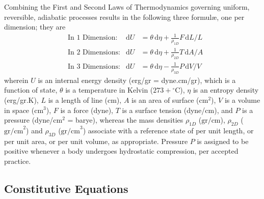 Combining the First and Second Laws of Thermo\-dynamics governing uniform, reversible, adiabatic processes results in the following three formul\ae, one per dimension; they are
\begin{subequations}
    \label{thermoelasticLaws}
    \begin{align}
    \mbox{} & \text{In 1 Dimension:} & 
    \mathrm{d}U & = \theta \, \mathrm{d} \eta +
    \tfrac{1}{\rho_{1D}} F \, \mathrm{d}L / L
    \label{thermoelastic1Dlaw} \\
    \mbox{} & \text{In 2 Dimensions:} &
    \mathrm{d}U & = \theta \, \mathrm{d} \eta + 
    \tfrac{1}{\rho_{2D}} T \, \mathrm{d}A / \! A
    \label{thermoelastic2Dlaw} \\
    \mbox{} & \text{In 3 Dimensions:} &
    \mathrm{d}U & = \theta \, \mathrm{d} \eta - 
    \tfrac{1}{\rho_{3D}} P \, \mathrm{d}V \! / V \!
    \label{thermoelastic3Dlaw}
    \end{align}
\end{subequations}
wherein $U$ is an internal energy density (erg/gr = dyne.cm/gr), which is a function of state, $\theta$ is a temperature in Kelvin ($273 + \mbox{}^{\circ}$C), $\eta$ is an entropy density (erg/gr.K), $L$ is a length of line (cm), $A$ is an area of surface ($\text{cm}^2$), $V$ is a volume in space ($\text{cm}^3$), $F$ is a force (dyne), $T$ is a surface tension (dyne/cm), and $P$ is a pressure (dyne/$\text{cm}^2$ = barye), whereas the mass densities $\rho_{1D}$ ($\text{gr/cm}$), $\rho_{2D}$ ($\text{gr/cm}^2$) and $\rho_{3D}$ ($\text{gr/cm}^3$) associate with a reference state of per unit length, or per unit area, or per unit volume, as appropriate.  Pressure $P$ is assigned to be positive whenever a body undergoes hydro\-static compression, per accepted practice.

\subsection{Constitutive Equations}

